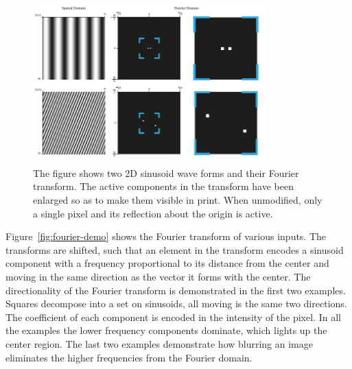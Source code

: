 \begin{figure}[htbp]
  \centering
  \includegraphics[width=0.8\textwidth]{figs/method/fourier/fourier-sinusoid.pdf}
  \caption[Fourier transform of sinusoid]{The figure shows two 2D sinusoid wave forms and their Fourier transform.
The active components in the transform have been enlarged so as to make them visible in print.
When unmodified, only a single pixel and its reflection about the origin is active.}\label{fig:fourier-sinusoid}
\end{figure}

Figure~\ref{fig:fourier-demo} shows the Fourier transform of various inputs.
The transforms are shifted, such that an element in the transform encodes a sinusoid component with a frequency proportional to its distance from the center and moving in the same direction as the vector it forms with the center.
The directionality of the Fourier transform is demonstrated in the first two examples.
Squares decompose into a set on sinusoids, all moving is the same two directions.
The coefficient of each component is encoded in the intensity of the pixel.
In all the examples the lower frequency components dominate, which lights up the center region.
The last two examples demonstrate how blurring an image eliminates the higher frequencies from the Fourier domain.

